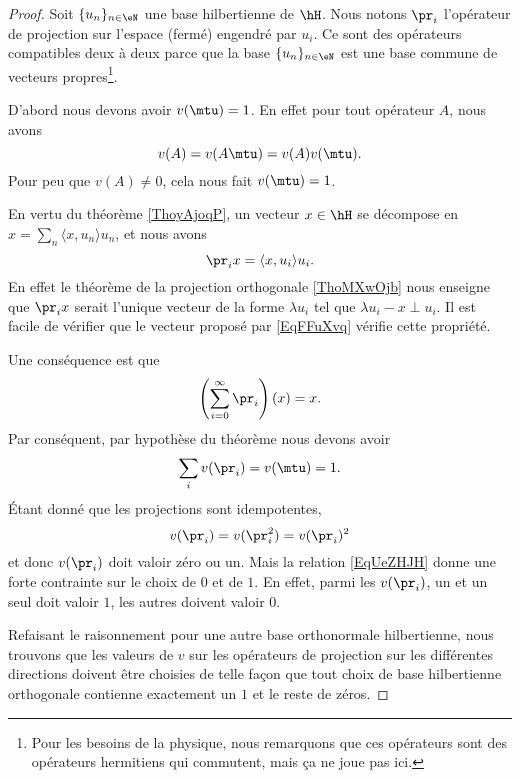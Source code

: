 \begin{proof}
    Soit \( \{ u_n \}_{n\in \eN}\) une base hilbertienne de \( \hH\). Nous notons \( \pr_i\) l'opérateur de projection sur l'espace (fermé) engendré par \( u_i\). Ce sont des opérateurs compatibles deux à deux parce que la base \( \{ u_n \}_{n\in \eN}\) est une base commune de vecteurs propres\footnote{Pour les besoins de la physique, nous remarquons que ces opérateurs sont des opérateurs hermitiens qui commutent, mais ça ne joue pas ici.}.

    D'abord nous devons avoir \( v(\mtu)=1\). En effet pour tout opérateur \( A\), nous avons
    \begin{equation}
        v(A)=v(A\mtu)=v(A)v(\mtu).
    \end{equation}
    Pour peu que \( v(A)\neq 0\), cela nous fait \( v(\mtu)=1\).

    En vertu du théorème \ref{ThoyAjoqP}, un vecteur \( x\in\hH\) se décompose en \( x=\sum_n\langle x, u_n\rangle u_n\), et nous avons
    \begin{equation}    \label{EqFFuXvq}
        \pr_ix=\langle x, u_i\rangle u_i.
    \end{equation}
    En effet le théorème de la projection orthogonale \ref{ThoMXwOjb} nous enseigne que \( \pr_ix\) serait l'unique vecteur de la forme \( \lambda u_i\) tel que \( \lambda u_i-x\perp u_i\). Il est facile de vérifier que le vecteur proposé par \eqref{EqFFuXvq} vérifie cette propriété.

    Une conséquence est que
    \begin{equation}
        \left( \sum_{i=0}^{\infty}\pr_i \right)(x)=x.
    \end{equation}
    Par conséquent, par hypothèse du théorème nous devons avoir
    \begin{equation}    \label{EqUeZHJH}
        \sum_iv(\pr_i)=v(\mtu)=1.
    \end{equation}
    Étant donné que les projections sont idempotentes,
    \begin{equation}
        v(\pr_i)=v(\pr_i^2)=v(\pr_i)^2
    \end{equation}
    et donc \( v(\pr_i)\) doit valoir zéro ou un. Mais la relation \eqref{EqUeZHJH} donne une forte contrainte sur le choix de \( 0\) et de \( 1\). En effet, parmi les \( v(\pr_i)\), un et un seul doit valoir \( 1\), les autres doivent valoir \( 0\).

    Refaisant le raisonnement pour une autre base orthonormale hilbertienne, nous trouvons que les valeurs de \( v\) sur les opérateurs de projection sur les différentes directions doivent être choisies de telle façon que tout choix de base hilbertienne orthogonale contienne exactement un \( 1\) et le reste de zéros.


\end{proof}
